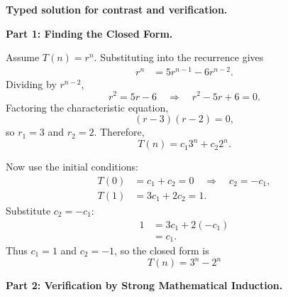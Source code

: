 \documentclass[12pt,a4paper]{article}
\begin{document}
\textbf{Typed solution for contrast and verification.}

\textbf{Part 1: Finding the Closed Form.}

Assume $T(n)=r^n$. Substituting into the recurrence gives
\begin{align*}
r^n &= 5r^{n-1}-6r^{n-2}.
\end{align*}
Dividing by $r^{n-2}$,
\begin{equation*}
r^2=5r-6
\quad \Longrightarrow \quad
r^2-5r+6=0.
\end{equation*}
Factoring the characteristic equation,
\begin{equation*}
(r-3)(r-2)=0,
\end{equation*}
so $r_1=3$ and $r_2=2$. Therefore,
\begin{equation*}
T(n)=c_1 3^n+c_2 2^n.
\end{equation*}

Now use the initial conditions:
\begin{align*}
T(0)&=c_1+c_2=0
\quad \Longrightarrow \quad
c_2=-c_1, \\
T(1)&=3c_1+2c_2=1.
\end{align*}
Substitute $c_2=-c_1$:
\begin{align*}
1 &= 3c_1+2(-c_1) \\
&= c_1.
\end{align*}
Thus $c_1=1$ and $c_2=-1$, so the closed form is
\begin{equation*}
T(n) = 3^n - 2^n
\end{equation*}

\textbf{Part 2: Verification by Strong Mathematical Induction.}
\end{document}
